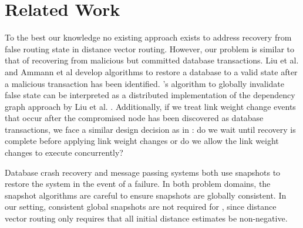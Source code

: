 \section{Related Work}
\label{sec:related-rollback}




To the best our knowledge no existing approach exists to address recovery from false routing state in distance vector routing. However,
our problem is similar to that of recovering from malicious but committed database transactions. Liu et al.
\cite{Liu98} and Ammann et al \cite{Liu00} develop algorithms to restore a database to a valid state after a malicious transaction has been identified. 
\purges's algorithm to globally invalidate
false state can be interpreted as a distributed implementation of the dependency graph approach by Liu et al. \cite{Liu00}.  Additionally,
if we treat link weight change events that occur after the compromised node has been discovered as database transactions, we face a similar design decision as in  \cite{Liu98}: 
do we wait until recovery is complete before applying link weight changes or do we allow the link weight changes to execute concurrently?


Database crash recovery \cite{Mohan92} and message passing systems \cite{Arini} both use snapshots to restore the system in the event of a failure. In both 
problem domains, the snapshot algorithms are careful to ensure snapshots are globally consistent. 
In our setting, consistent global snapshots are not required for \cprs, since  
distance vector routing only requires that all initial distance estimates be non-negative.

